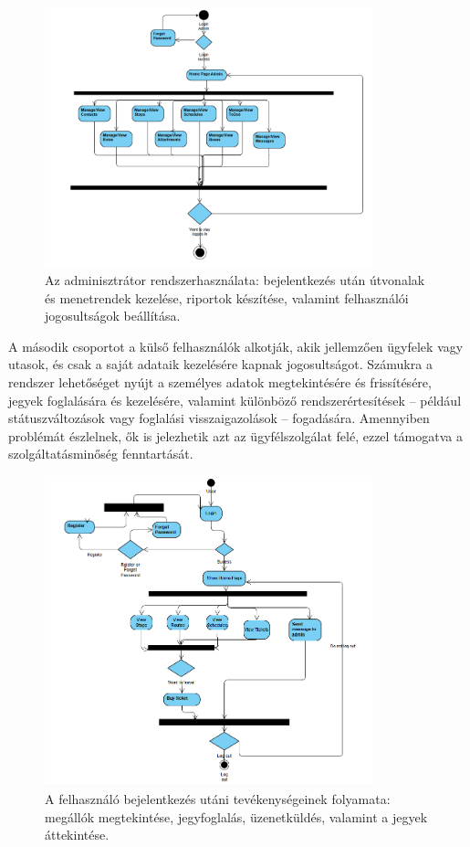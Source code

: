 \begin{figure}[h!]
    \centering
    \includegraphics[width=0.85\textwidth]{Szakdolgozat/Mellekletek/activityadmin.PNG}
    \caption{Az adminisztrátor rendszerhasználata: bejelentkezés után útvonalak és menetrendek kezelése, riportok készítése, valamint felhasználói jogosultságok beállítása.}
    \label{fig:admin-activity}
\end{figure}

A második csoportot a külső felhasználók alkotják, akik jellemzően ügyfelek vagy utasok, és csak a saját adataik kezelésére kapnak jogosultságot. Számukra a rendszer lehetőséget nyújt a személyes adatok megtekintésére és frissítésére, jegyek foglalására és kezelésére, valamint különböző rendszerértesítések – például státuszváltozások vagy foglalási visszaigazolások – fogadására. Amennyiben problémát észlelnek, ők is jelezhetik azt az ügyfélszolgálat felé, ezzel támogatva a szolgáltatásminőség fenntartását.

\begin{figure}[h!]
    \centering
    \includegraphics[width=0.85\textwidth]{Szakdolgozat/Mellekletek/activityuser.PNG}
    \caption{A felhasználó bejelentkezés utáni tevékenységeinek folyamata: megállók megtekintése, jegyfoglalás, üzenetküldés, valamint a jegyek áttekintése.}
    \label{fig:user-activity}
\end{figure}


